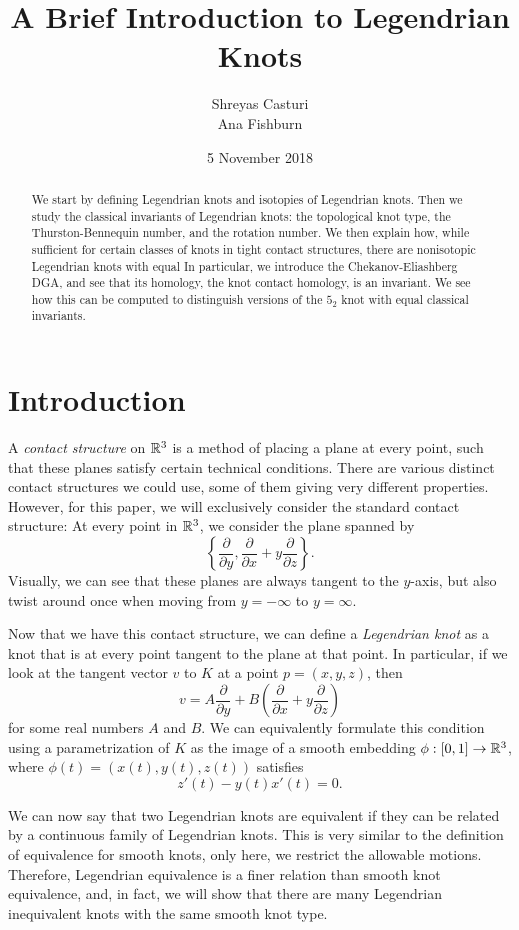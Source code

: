 \documentclass{article}
\title{A Brief Introduction to Legendrian Knots}
\author{Shreyas Casturi\\Ana Fishburn}
\date{5 November 2018}
\begin{document}
\maketitle

\begin{abstract}
We start by defining Legendrian knots and isotopies of Legendrian knots.
Then we study the classical invariants of Legendrian knots:
the topological knot type, the Thurston-Bennequin number, and the rotation number.
We then explain how, while sufficient for certain classes of knots in tight
contact structures, there are nonisotopic Legendrian knots with equal
In particular, we introduce the Chekanov-Eliashberg DGA, and see that its
homology, the knot contact homology, is an invariant. We see how this
can be computed to distinguish versions of the $5_2$ knot with equal classical
invariants.
\end{abstract}

\section{Introduction}
A {\it contact structure} on $\mathbb{R}^3$ is a method of placing a plane at every point,
such that these planes satisfy certain technical conditions.
There are various distinct contact structures we could use, some of them giving
very different properties.
However, for this paper, we will exclusively consider the standard contact structure:
At every point in $\mathbb{R}^3$, we consider the plane spanned by
\[\left\{\frac{\partial}{\partial y},\frac{\partial}{\partial x} + y\frac{\partial}{\partial z}\right\}.\]
Visually, we can see that these planes are always tangent to the $y$-axis, but also
twist around once when moving from $y = -\infty$ to $y = \infty$.

Now that we have this contact structure, we can define a {\it Legendrian knot}
as a knot that is at every point tangent to the plane at that point.
In particular, if we look at the tangent vector $v$ to $K$ at a point $p = (x,y,z)$,
then
\[ v = A\frac{\partial}{\partial y} + B\left(\frac{\partial}{\partial x} +y\frac{\partial}{\partial z}\right)\]
for some real numbers $A$ and $B$.
We can equivalently formulate this condition using a parametrization of $K$ as
the image of a smooth embedding $\phi : [0,1] \to \mathbb{R}^3$, where $\phi(t) = (x(t),y(t),z(t))$ satisfies
\[ z'(t)-y(t)x'(t) = 0.\]

We can now say that two Legendrian knots are equivalent if they can be related by a continuous
family of Legendrian knots. This is very similar to the definition of equivalence
for smooth knots, only here, we restrict the allowable motions.
Therefore, Legendrian equivalence is a finer relation than smooth knot equivalence,
and, in fact, we will show that there are many Legendrian inequivalent knots
with the same smooth knot type.
\end{document}
